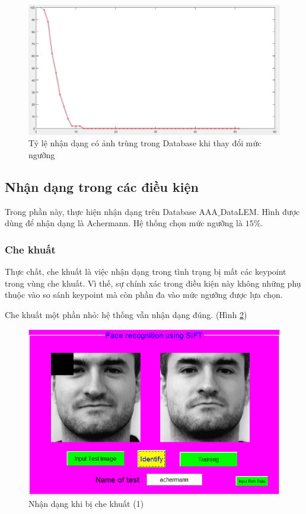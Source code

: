 \documentclass[conference]{IEEEtran}
\begin{document}
\begin{figure}
  \includegraphics[width=\linewidth]{bieudo3_tinh}
  \caption{Tỷ lệ nhận dạng có ảnh trùng trong Database khi thay đổi mức ngưỡng}
  \label{fig:bieudo3_tinh}
\end{figure} 

\subsection{Nhận dạng trong các điều kiện}
Trong phần này, thực hiện nhận dạng trên Database AAA$\_$DataLEM. Hình được dùng để nhận dạng là Achermann. Hệ thống chọn mức ngưỡng là $15\%$.
\subsubsection{Che khuất}
Thực chất, che khuất là việc nhận dạng trong tình trạng bị mất các keypoint trong vùng che khuất. Vì thế, sự chính xác trong điều kiện này không những phụ thuộc vào so sánh keypoint mà còn phần đa vào mức ngưỡng được lựa chọn.

    Che khuất một phần nhỏ: hệ thống vẫn nhận dạng đúng. (Hình \ref{fig:bieudo4_tinh})
  \begin{figure}
  \includegraphics[width=\linewidth]{bieudo4_tinh}
  \caption{Nhận dạng khi bị che khuất (1)}
  \label{fig:bieudo4_tinh}
\end{figure}   
\end{document}
